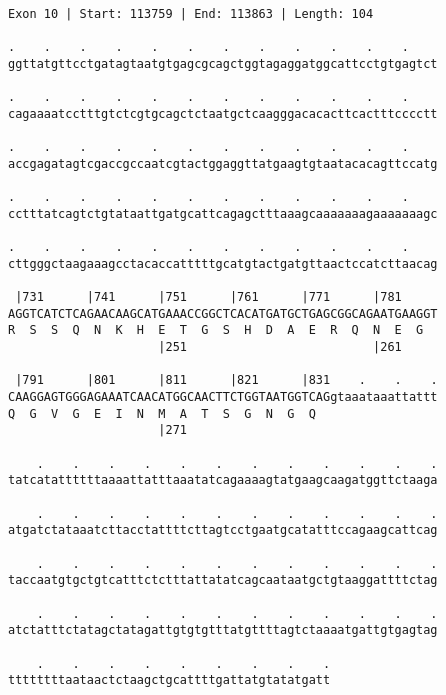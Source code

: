 \documentclass{article}
\begin{document}
\begin{Verbatim}[fontfamily=courier]
Exon 10 | Start: 113759 | End: 113863 | Length: 104

.    .    .    .    .    .    .    .    .    .    .    .    
ggttatgttcctgatagtaatgtgagcgcagctggtagaggatggcattcctgtgagtct

.    .    .    .    .    .    .    .    .    .    .    .    
cagaaaatcctttgtctcgtgcagctctaatgctcaagggacacacttcactttcccctt

.    .    .    .    .    .    .    .    .    .    .    .    
accgagatagtcgaccgccaatcgtactggaggttatgaagtgtaatacacagttccatg

.    .    .    .    .    .    .    .    .    .    .    .    
cctttatcagtctgtataattgatgcattcagagctttaaagcaaaaaaagaaaaaaagc

.    .    .    .    .    .    .    .    .    .    .    .    
cttgggctaagaaagcctacaccatttttgcatgtactgatgttaactccatcttaacag

 |731      |741      |751      |761      |771      |781     
AGGTCATCTCAGAACAAGCATGAAACCGGCTCACATGATGCTGAGCGGCAGAATGAAGGT
R  S  S  Q  N  K  H  E  T  G  S  H  D  A  E  R  Q  N  E  G  
                     |251                          |261     

 |791      |801      |811      |821      |831    .    .    .
CAAGGAGTGGGAGAAATCAACATGGCAACTTCTGGTAATGGTCAGgtaaataaattattt
Q  G  V  G  E  I  N  M  A  T  S  G  N  G  Q                 
                     |271                                   

    .    .    .    .    .    .    .    .    .    .    .    .
tatcatattttttaaaattatttaaatatcagaaaagtatgaagcaagatggttctaaga

    .    .    .    .    .    .    .    .    .    .    .    .
atgatctataaatcttacctattttcttagtcctgaatgcatatttccagaagcattcag

    .    .    .    .    .    .    .    .    .    .    .    .
taccaatgtgctgtcatttctctttattatatcagcaataatgctgtaaggattttctag

    .    .    .    .    .    .    .    .    .    .    .    .
atctatttctatagctatagattgtgtgtttatgttttagtctaaaatgattgtgagtag

    .    .    .    .    .    .    .    .    .
ttttttttaataactctaagctgcattttgattatgtatatgatt
\end{Verbatim}
\newpage
\end{document}
